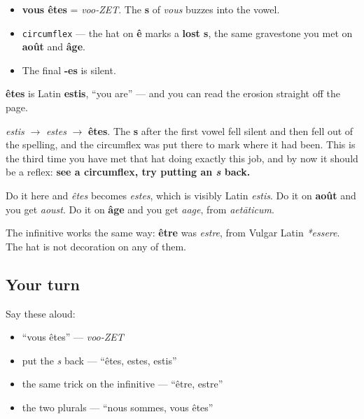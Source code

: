 \begin{sounds}
\begin{itemize}
\raggedright
  \item \textbf{vous êtes} = \emph{voo-ZET}. The \textbf{s} of \emph{vous} buzzes into the vowel.
  \item \texttt{circumflex} — the hat on \textbf{ê} marks a \textbf{lost s}, the same gravestone you met on \textbf{août} and \textbf{âge}.
  \item The final \textbf{-es} is silent.
\end{itemize}
\end{sounds}

\begin{cousinweb}
\textbf{êtes} is Latin \textbf{estis}, \textquotedblleft{}you are\textquotedblright{} — and you can read the erosion straight off the page.

\emph{estis} $\to$ \emph{estes} $\to$ \textbf{êtes}. The \textbf{s} after the first vowel fell silent and then fell out of the spelling, and the circumflex was put there to mark where it had been. This is the third time you have met that hat doing exactly this job, and by now it should be a reflex: \textbf{see a circumflex, try putting an \emph{s} back.}

Do it here and \emph{êtes} becomes \emph{estes}, which is visibly Latin \emph{estis}. Do it on \textbf{août} and you get \emph{aoust}. Do it on \textbf{âge} and you get \emph{aage}, from \emph{aetāticum}.

The infinitive works the same way: \textbf{être} was \emph{estre}, from Vulgar Latin \emph{*essere}. The hat is not decoration on any of them.
\end{cousinweb}

\subsection*{Your turn}
Say these aloud:

\begin{itemize}
\raggedright
  \item \textquotedblleft{}vous êtes\textquotedblright{} — \emph{voo-ZET}
  \item put the \emph{s} back — \textquotedblleft{}êtes, estes, estis\textquotedblright{}
  \item the same trick on the infinitive — \textquotedblleft{}être, estre\textquotedblright{}
  \item the two plurals — \textquotedblleft{}nous sommes, vous êtes\textquotedblright{}
\end{itemize}

